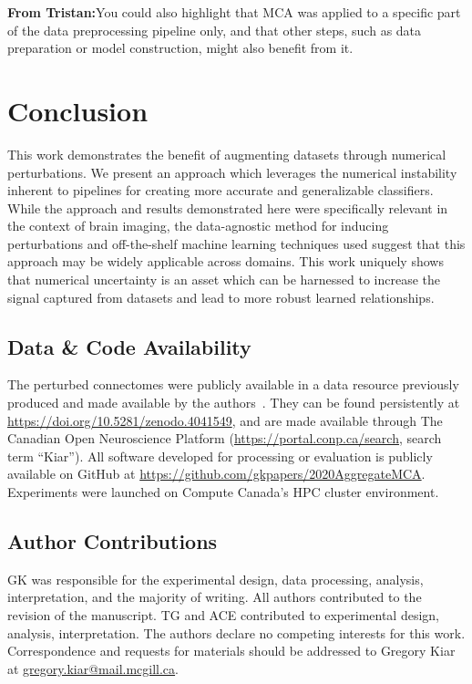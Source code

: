 \documentclass[10pt]{SelfArx} %
\newcommand{\tristan}[1]{\color{orange}\textbf{From Tristan:}#1\color{black}}
\begin{document}
\tristan{You could also highlight that MCA was applied to a specific part of 
the data preprocessing pipeline only, and that other steps, such as data preparation 
or model construction, might also benefit from it.}

\section*{Conclusion}

This work demonstrates the benefit of augmenting datasets through numerical perturbations. We present an approach which
leverages the numerical instability inherent to pipelines for creating more accurate and generalizable classifiers.
While the approach and results demonstrated here were specifically relevant in the context of brain imaging, the
data-agnostic method for inducing perturbations and off-the-shelf machine learning techniques used suggest that this
approach may be widely applicable across domains. This work uniquely shows that numerical uncertainty is an asset which
can be harnessed to increase the signal captured from datasets and lead to more robust learned relationships.


\subsection*{Data \& Code Availability}
The perturbed connectomes were publicly available in a data resource previously produced and made available by the
authors~\cite{Kiar2020-yz}. They can be found persistently at \url{https://doi.org/10.5281/zenodo.4041549}, and are
made available through The Canadian Open Neuroscience Platform (\url{https://portal.conp.ca/search}, search term
``Kiar''). All software developed for processing or evaluation is publicly available on GitHub at
\url{https://github.com/gkpapers/2020AggregateMCA}. Experiments were launched on Compute Canada's HPC cluster
environment. 

\subsection*{Author Contributions}
GK was responsible for the experimental design, data processing, analysis, interpretation, and the majority of writing.
All authors contributed to the revision of the manuscript. TG and ACE contributed to experimental design, analysis,
interpretation. The authors declare no competing interests for this work. Correspondence and requests for materials
should be addressed to Gregory Kiar at \url{gregory.kiar@mail.mcgill.ca}.
\end{document}

